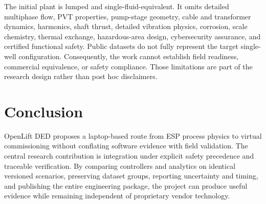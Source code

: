 \documentclass[conference]{IEEEtran}
\begin{document}
The initial plant is lumped and single-fluid-equivalent. It omits detailed multiphase flow, PVT properties, pump-stage geometry, cable and transformer dynamics, harmonics, shaft thrust, detailed vibration physics, corrosion, scale chemistry, thermal exchange, hazardous-area design, cybersecurity assurance, and certified functional safety. Public datasets do not fully represent the target single-well configuration. Consequently, the work cannot establish field readiness, commercial equivalence, or safety compliance. Those limitations are part of the research design rather than post hoc disclaimers.

\section{Conclusion}
OpenLift DED proposes a laptop-based route from ESP process physics to virtual commissioning without conflating software evidence with field validation. The central research contribution is integration under explicit safety precedence and traceable verification. By comparing controllers and analytics on identical versioned scenarios, preserving dataset groups, reporting uncertainty and timing, and publishing the entire engineering package, the project can produce useful evidence while remaining independent of proprietary vendor technology.

\ifofficialieee

\else
{\footnotesize}
\fi
\end{document}
